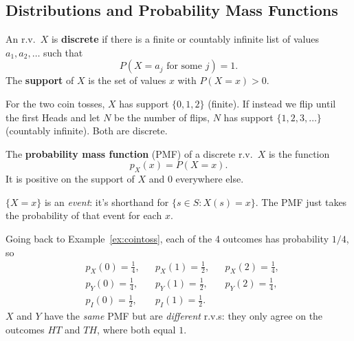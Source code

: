 \bigskip

\subsection{Distributions and Probability Mass Functions}

\bigskip

\begin{definition}\label{def:discrete}
An r.v.\ $X$ is \textbf{discrete} if there is a finite or countably infinite list of values $a_1, a_2, \dots$ such that
\medskip
\[
P(X = a_j \text{ for some } j) = 1.
\]
\medskip
The \textbf{support} of $X$ is the set of values $x$ with $P(X = x) > 0$.
\end{definition}

\bigskip

\begin{example}[Supports]
For the two coin tosses, $X$ has support $\{0, 1, 2\}$ (finite). If instead we flip until the first Heads and let $N$ be the number of flips, $N$ has support $\{1, 2, 3, \dots\}$ (countably infinite). Both are discrete.
\end{example}

\bigskip

\begin{definition}\label{def:pmf}
The \textbf{probability mass function} (PMF) of a discrete r.v.\ $X$ is the function
\medskip
\[
p_X(x) = P(X = x).
\]
\medskip
It is positive on the support of $X$ and $0$ everywhere else.
\end{definition}

\bigskip

\begin{remark}
$\{X = x\}$ is an \emph{event}: it's shorthand for $\{s \in S : X(s) = x\}$. The PMF just takes the probability of that event for each $x$.
\end{remark}

\bigskip

\begin{example}\label{ex:coinpmf}
Going back to Example~\ref{ex:cointoss}, each of the 4 outcomes has probability $1/4$, so
\medskip
\begin{align*}
&p_X(0) = \tfrac{1}{4}, && p_X(1) = \tfrac{1}{2}, && p_X(2) = \tfrac{1}{4}, \\[0.6em]
&p_Y(0) = \tfrac{1}{4}, && p_Y(1) = \tfrac{1}{2}, && p_Y(2) = \tfrac{1}{4}, \\[0.6em]
&p_I(0) = \tfrac{1}{2}, && p_I(1) = \tfrac{1}{2}.
\end{align*}
\medskip
$X$ and $Y$ have the \emph{same} PMF but are \emph{different} r.v.s: they only agree on the outcomes $HT$ and $TH$, where both equal $1$.
\end{example}

